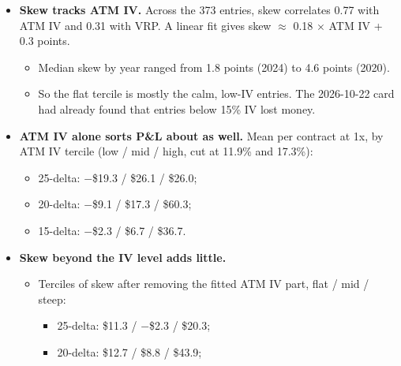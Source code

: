 \documentclass{article}
\begin{document}
\begin{itemize}

\item \textbf{Skew tracks ATM IV.} Across the 373 entries, skew correlates 0.77 with ATM IV and 0.31 with VRP. A linear fit gives skew \ensuremath{\approx} 0.18 \ensuremath{\times} ATM IV + 0.3 points.

\begin{itemize}

\item Median skew by year ranged from 1.8 points (2024) to 4.6 points (2020).

\item So the flat tercile is mostly the calm, low-IV entries. The 2026-10-22 card had already found that entries below 15\% IV lost money.

\end{itemize}

\item \textbf{ATM IV alone sorts P\&L about as well.} Mean per contract at 1x, by ATM IV tercile (low /\allowbreak{} mid /\allowbreak{} high, cut at 11.9\% and 17.3\%):

\begin{itemize}

\item 25-delta: \ensuremath{-}\$19.3 /\allowbreak{} \$26.1 /\allowbreak{} \$26.0;

\item 20-delta: \ensuremath{-}\$9.1 /\allowbreak{} \$17.3 /\allowbreak{} \$60.3;

\item 15-delta: \ensuremath{-}\$2.3 /\allowbreak{} \$6.7 /\allowbreak{} \$36.7.

\end{itemize}

\item \textbf{Skew beyond the IV level adds little.}

\begin{itemize}

\item Terciles of skew after removing the fitted ATM IV part, flat /\allowbreak{} mid /\allowbreak{} steep:

\begin{itemize}

\item 25-delta: \$11.3 /\allowbreak{} \ensuremath{-}\$2.3 /\allowbreak{} \$20.3;

\item 20-delta: \$12.7 /\allowbreak{} \$8.8 /\allowbreak{} \$43.9;


\end{itemize}
\end{itemize}
\end{itemize}
\end{document}
